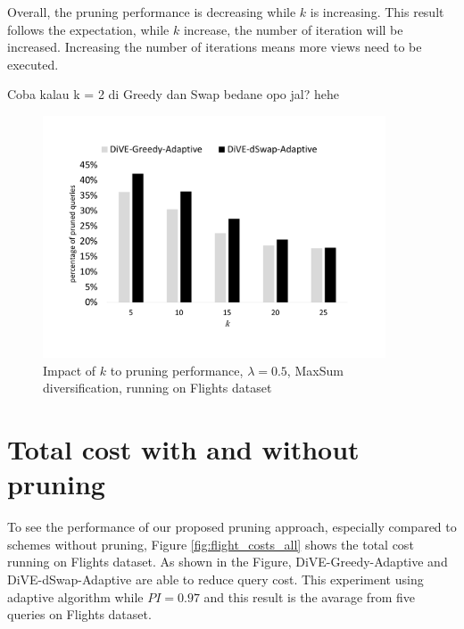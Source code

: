 \documentclass{article}
\begin{document}
Overall, the pruning performance is decreasing while $k$ is increasing. This result follows the expectation, while $k$ increase, the number of iteration will be increased. Increasing the number of iterations means more views need to be executed. 

Coba kalau k = 2 di Greedy dan Swap bedane opo jal? hehe

\begin{figure}
	\begin{center}
		\includegraphics[width=4.0in]{figures/Impact_k_performance}
		\vspace{-30pt}
		\caption{Impact of $k$ to pruning performance, $\lambda = 0.5$, MaxSum diversification, running on Flights dataset}
		\label{fig:impact-of-k-pruning-performance}
		
	\end{center}
\end{figure}



\section{Total cost with and without pruning}
To see the performance of our proposed pruning approach, especially compared to schemes without pruning, Figure \ref{fig:flight_costs_all} shows the total cost running on Flights dataset. As shown in the Figure, DiVE-Greedy-Adaptive and DiVE-dSwap-Adaptive are able to reduce query cost. This experiment using adaptive algorithm while $ PI = 0.97 $ and this result is the avarage from five queries on Flights dataset. 
\end{document}
